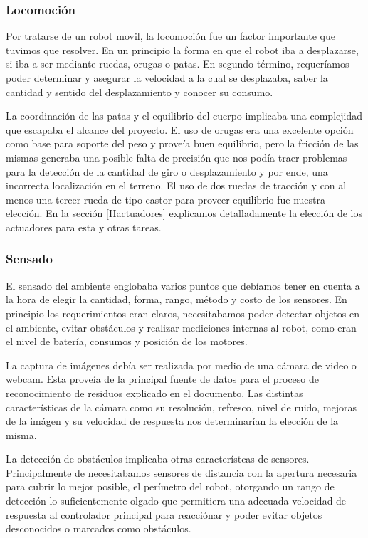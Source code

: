 \subsubsection{Locomoci\'on}

Por tratarse de un robot movil, la locomoci\'on fue un factor importante que tuvimos que resolver. En un principio la forma en que el robot iba a desplazarse,
si iba a ser mediante ruedas, orugas o patas. En segundo t\'ermino, requer\'iamos poder determinar y asegurar la velocidad a la cual se desplazaba,
saber la cantidad y sentido del desplazamiento y conocer su consumo.

La coordinaci\'on de las patas y el equilibrio del cuerpo implicaba una complejidad que escapaba el alcance del proyecto. El uso de orugas era una
excelente opci\'on como base para soporte del peso y prove\'ia buen equilibrio, pero la fricci\'on de las mismas generaba una posible falta de
precisi\'on que nos pod\'ia traer problemas para la detecci\'on de la cantidad de giro o desplazamiento y por ende, una incorrecta localizaci\'on en
el terreno. El uso de dos ruedas de tracci\'on y con al menos una tercer rueda de tipo castor para proveer equilibrio fue nuestra elecci\'on.
En la secci\'on \ref{Hactuadores} explicamos detalladamente la elecci\'on de los actuadores para esta y otras tareas.

\subsubsection{Sensado}

El sensado del ambiente englobaba varios puntos que deb\'iamos tener en cuenta a la hora de elegir la cantidad, forma, rango, m\'etodo y costo
de los sensores. En principio los requerimientos eran claros, necesitabamos poder detectar objetos en el ambiente, evitar obst\'aculos y realizar
mediciones internas al robot, como eran el nivel de bater\'ia, consumos y posici\'on de los motores.

La captura de im\'agenes deb\'ia ser realizada por medio de una c\'amara de video o webcam. Esta prove\'ia de la principal fuente de datos para
el proceso de reconocimiento de residuos explicado en el documento. Las distintas caracter\'isticas de la c\'amara como su resoluci\'on, refresco,
nivel de ruido, mejoras de la im\'agen y su velocidad de respuesta nos determinar\'ian la elecci\'on de la misma.

La detecci\'on de obst\'aculos implicaba otras caracter\'istcas de sensores. Principalmente de necesitabamos sensores de distancia con la apertura
necesaria para cubrir lo mejor posible, el per\'imetro del robot, otorgando un rango de detecci\'on lo suficientemente olgado que permitiera una adecuada
velocidad de respuesta al controlador principal para reacci\'onar y poder evitar objetos desconocidos o marcados como obst\'aculos.

